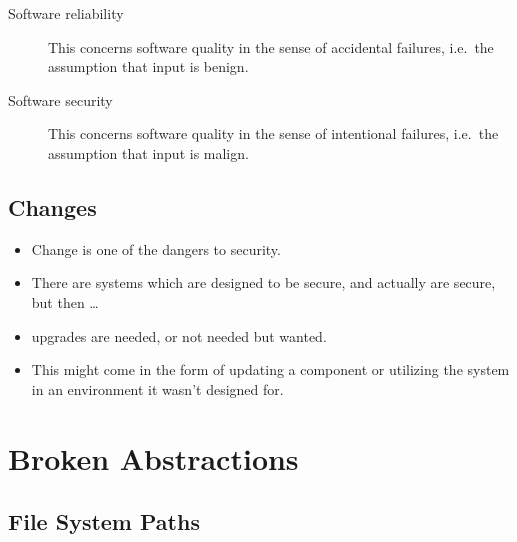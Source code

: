 \begin{frame}
  \begin{description}
    \item[Software reliability] This concerns software quality in the sense of 
      accidental failures, i.e.\ the assumption that input is benign.

      \pause{}

    \item[Software security] This concerns software quality in the sense of 
      intentional failures, i.e.\ the assumption that input is malign.

  \end{description}
\end{frame}

\subsection{Changes}


\begin{frame}
  \begin{itemize}
    \item Change is one of the dangers to security.

    \item There are systems which are designed to be secure, and actually are 
      secure, but then \dots

    \item upgrades are needed, or not needed but wanted.

    \item This might come in the form of updating a component or utilizing the 
      system in an environment it wasn't designed for.

  \end{itemize}
\end{frame}


\section{Broken Abstractions}

\subsection{File System Paths}

\begin{frame}[fragile]
  \inputminted{python}{jail.py}
\end{frame}

